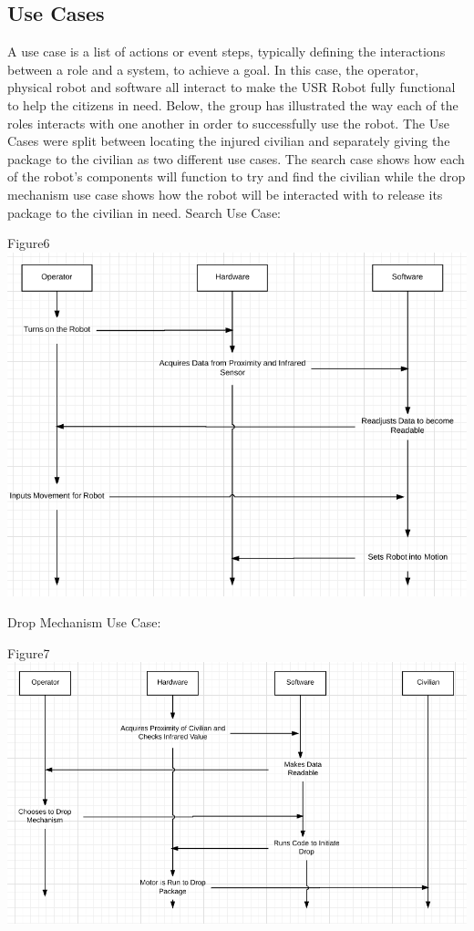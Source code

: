 \documentclass{article}
\begin{document}
\subsection{Use Cases}
A use case is a list of actions or event steps, typically defining the interactions between a role and a system, to achieve a goal. In this case, the operator, physical robot and software all interact to make the USR Robot fully functional to help the citizens in need. Below, the group has illustrated the way each of the roles interacts with one another in order to successfully use the robot. The Use Cases were split between locating the injured civilian and separately giving the package to the civilian as two different use cases. The search case shows how each of the robot's components will function to try and find the civilian while the drop mechanism use case shows how the robot will be interacted with to release its package to the civilian in need.
    \newpage
    Search Use Case:
    \begin{center}{Figure6 \includegraphics[width=\textwidth]{SearchCase.png}}\end{center}
    
    \newpage
    Drop Mechanism Use Case:
    \begin{center}{Figure7 \includegraphics[width=\textwidth]{DropCase.png}}\end{center}
    
\end{document}
